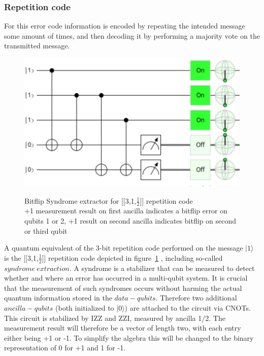 \subsubsection{Repetition code}
For this error code information is encoded by repeating the 
intended message some amount of times, and then decoding it
by performing a majority vote on the transmitted message.


\begin{figure}[h!]
	\begin{center}
	\captionsetup{justification=centering,margin=2cm}
	\includegraphics[scale=0.2]{./img/figures/bitflipSyndromeExtraction3Rep.png}\\
	\caption{Bitflip Syndrome extractor for [[3,1,$\frac{1}{2}$]] repetition code\\
        +1 measurement result on first ancilla indicates a bitflip error
        on qubits 1 or 2, +1 result on second ancilla indicates 
		bitflip on second or third qubit}
	\label{fig: syndrome extractor}
	\end{center}
\end{figure}

A quantum equivalent of the 3-bit repetition code performed on
the message $|1\rangle$ is the [[3,1,$\frac{1}{2}$]] repetition
code depicted in 
figure~\ref{fig: syndrome extractor}
, including so-called
$syndrome\ extraction$. A syndrome is a stabilizer that can be
measured to detect whether and where an error has occurred
in a multi-qubit system. It is crucial that the 
measurement of such syndromes occurs without harming the actual
quantum information stored in the $data-qubits$. Therefore
two additional $ancilla-qubits$ (both initialized to 
$|0\rangle$) are attached to the circuit via CNOTs.
This circuit is stabilized by IZZ and ZZI, measured by ancilla 
1/2. The measurement result will therefore be a vector of length
two, with each entry either being +1 or -1. To simplify the 
algebra this will be changed to the binary representation of 0 
for +1 and 1 for -1. 

